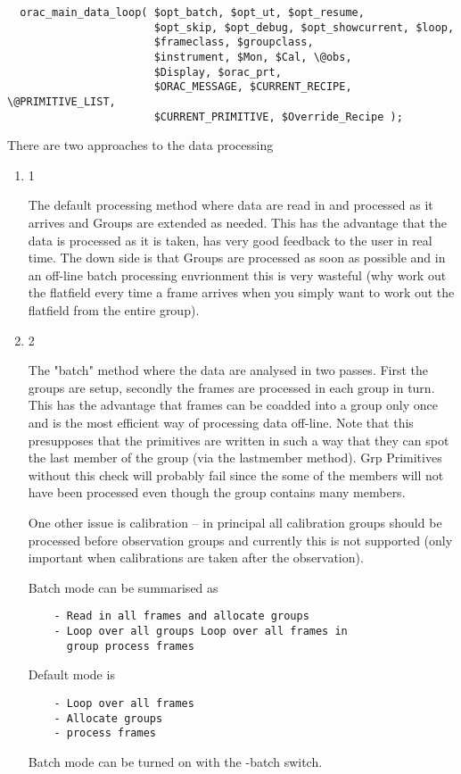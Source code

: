 \begin{description}
\begin{verbatim}
  orac_main_data_loop( $opt_batch, $opt_ut, $opt_resume, 
                       $opt_skip, $opt_debug, $opt_showcurrent, $loop, 
                       $frameclass, $groupclass, 
                       $instrument, $Mon, $Cal, \@obs, 
                       $Display, $orac_prt,
                       $ORAC_MESSAGE, $CURRENT_RECIPE, \@PRIMITIVE_LIST,
                       $CURRENT_PRIMITIVE, $Override_Recipe );
\end{verbatim}


There are two approaches to the data processing

\begin{enumerate}
\item 1

The default processing method where data are read in and processed as
it arrives and Groups are extended as needed. This has the advantage
that the data is processed as it is taken, has very good feedback to
the user in real time. The down side is that Groups are processed as
soon as possible and in an off-line batch processing envrionment this
is very wasteful (why work out the flatfield every time a frame
arrives when you simply want to work out the flatfield from the entire
group).

\item 2

The "batch" method where the data are analysed in two passes.  First
the groups are setup, secondly the frames are processed in each group
in turn. This has the advantage that frames can be coadded into a
group only once and is the most efficient way of processing data
off-line. Note that this presupposes that the primitives are written
in such a way that they can spot the last member of the group (via the
lastmember method). Grp Primitives without this check will probably
fail since the some of the members will not have been processed even
though the group contains many members.



One other issue is calibration -- in principal all calibration groups
should be processed before observation groups and currently this is
not supported (only important when calibrations are taken after the
observation).



Batch mode can be summarised as

\begin{verbatim}
    - Read in all frames and allocate groups 
    - Loop over all groups Loop over all frames in
      group process frames
\end{verbatim}


Default mode is

\begin{verbatim}
    - Loop over all frames 
    - Allocate groups 
    - process frames
\end{verbatim}


Batch mode can be turned on with the -batch switch.

\end{enumerate}
\end{description}


